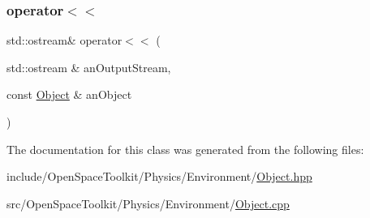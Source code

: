 \subsubsection{\texorpdfstring{operator$<$$<$}{operator<<}}
{\footnotesize\ttfamily std\+::ostream\& operator$<$$<$ (\begin{DoxyParamCaption}\item[{std\+::ostream \&}]{an\+Output\+Stream,  }\item[{const \hyperlink{classostk_1_1physics_1_1env_1_1_object}{Object} \&}]{an\+Object }\end{DoxyParamCaption})\hspace{0.3cm}{\ttfamily [friend]}}



The documentation for this class was generated from the following files\+:\begin{DoxyCompactItemize}
\item 
include/\+Open\+Space\+Toolkit/\+Physics/\+Environment/\hyperlink{_object_8hpp}{Object.\+hpp}\item 
src/\+Open\+Space\+Toolkit/\+Physics/\+Environment/\hyperlink{_object_8cpp}{Object.\+cpp}\end{DoxyCompactItemize}
